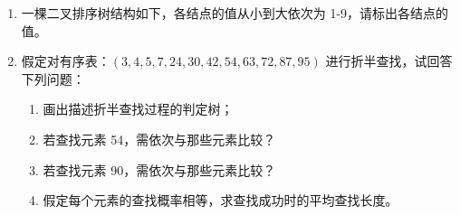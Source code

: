 \documentclass[12pt, a4paper]{article}
\begin{document}
\begin{enumerate}
	\item 一棵二叉排序树结构如下，各结点的值从小到大依次为 1-9，请标出各结点的值。

	\item 假定对有序表：$(3, 4, 5, 7, 24, 30, 42, 54, 63, 72, 87, 95)$ 进行折半查找，试回答下列问题：
	      \begin{enumerate}
		      \item 画出描述折半查找过程的判定树；
		      \item 若查找元素 54，需依次与那些元素比较？
		      \item 若查找元素 90，需依次与那些元素比较？
		      \item 假定每个元素的查找概率相等，求查找成功时的平均查找长度。
	      \end{enumerate}
\end{enumerate}
\end{document}
